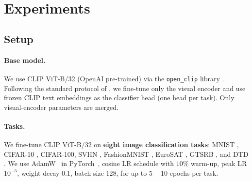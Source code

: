 \documentclass{article} %
\begin{document}
\section{Experiments}
\label{sec:exp}

\subsection{Setup}

\paragraph{Base model.} We use CLIP ViT-B/32 (OpenAI pre-trained) \citep{radford2021learning} via the \texttt{open\_clip} library \citep{openclip2023}. Following the standard protocol of \citet{ilharco2023editing,yadav2023tiesmerging}, we fine-tune only the visual encoder and use frozen CLIP text embeddings as the classifier head (one head per task). Only visual-encoder parameters are merged.

\paragraph{Tasks.} We fine-tune CLIP ViT-B/32 on \textbf{eight image classification tasks}: MNIST \citep{lecun1998mnist}, CIFAR-10 \citep{krizhevsky2009cifar}, CIFAR-100, SVHN \citep{netzer2011svhn}, FashionMNIST \citep{xiao2017fashion}, EuroSAT \citep{helber2019eurosat}, GTSRB \citep{stallkamp2011gtsrb}, and DTD \citep{cimpoi2014dtd}. We use AdamW~\citep{loshchilov2019decoupled} in PyTorch~\citep{paszke2019pytorch}, cosine LR schedule with $10\%$ warm-up, peak LR $10^{-5}$, weight decay $0.1$, batch size $128$, for up to $5{-}10$ epochs per task.
\end{document}
